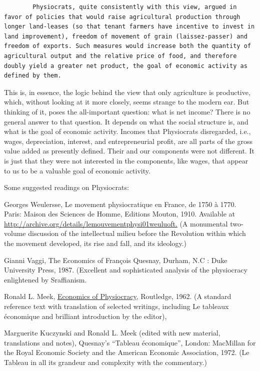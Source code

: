 \documentclass[
]{book}
\begin{document}
\begin{verbatim}
        Physiocrats, quite consistently with this view, argued in favor of policies that would raise agricultural production through longer land-leases (so that tenant farmers have incentive to invest in land improvement), freedom of movement of grain (laissez-passer) and freedom of exports. Such measures would increase both the quantity of agricultural output and the relative price of food, and therefore doubly yield a greater net product, the goal of economic activity as defined by them.
\end{verbatim}

This is, in essence, the logic behind the view that only agriculture is productive, which, without looking at it more closely, seems strange to the modern ear. But thinking of it, poses the all-important question: what is net income? There is no general answer to that question. It depends on what the social structure is, and what is the goal of economic activity. Incomes that Physiocrats disregarded, i.e., wages, depreciation, interest, and entrepreneurial profit, are all parts of the gross value added as presently defined. Their and our components were not different. It is just that they were not interested in the components, like wages, that appear to us to be a valuable goal of economic activity.

Some suggested readings on Physiocrats:

Georges Weulersse, Le movement physiocratique en France, de 1750 à 1770. Paris: Maison des Sciences de Homme, Editions Mouton, 1910. Available at \href{http://archive.org/details/lemouvementphysi01weuluoft}{http://archive.org/details/lemouvementphysi01weuluoft.} (A monumental two-volume discussion of the intellectual milieu before the Revolution within which the movement developed, its rise and fall, and its ideology.)

Gianni Vaggi, The Economics of François Quesnay, Durham, N.C : Duke University Press, 1987. (Excellent and sophisticated analysis of the physiocracy enlightened by Sraffianism.

Ronald L. Meek, \href{https://www.routledge.com/Economics-of-Physiocracy/Meek/p/book/9780415488846}{Economics of Physiocracy}, Routledge, 1962. (A standard reference text with translation of selected writings, including Le tableaux économique and brilliant introduction by the editor),

Marguerite Kuczynski and Ronald L. Meek (edited with new material, translations and notes), Quesnay's ``Tableau économique'', London: MacMillan for the Royal Economic Society and the American Economic Association, 1972. (Le Tableau in all its grandeur and complexity with the commentary.)
\end{document}

